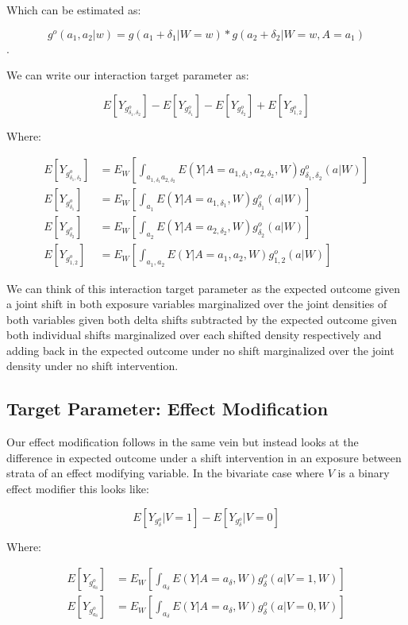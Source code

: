 \documentclass[
]{article}
\begin{document}
Which can be estimated as:

\[g^o(a_1, a_2|w) =  g(a_1 + \delta_1|W = w) * g(a_2 + \delta_2|W = w, A = a_1)\].

We can write our interaction target parameter as:

\[E[Y_{g^o_{\delta_1,\delta_2}}] - E[Y_{g^o_{\delta_1}}] - E[Y_{g^o_{\delta_2}}] + E[Y_{g^o_{1,2}}]\]

Where:

\begin{equation} \label{eq2}
\begin{split}
E[Y_{g^o_{\delta_1,\delta_2}}] &= E_W [\int_{a_{1,\delta_1} a_{2, \delta_2}} E(Y|A=a_{1,\delta_1},a_{2,\delta_2} , W)g^o_{\delta_1,\delta_2}(a|W)]\\
E[Y_{g^o_{\delta_1}}] &= E_W [\int_{a_1} E(Y|A=a_{1, \delta_1}, W)g^o_{\delta_1}(a|W)]\\
E[Y_{g^o_{\delta_2}}] &= E_W [\int_{a_2} E(Y|A=a_{2, \delta_2}, W)g^o_{\delta_2}(a|W)]\\
E[Y_{g^o_{1,2}}] &= E_W [\int_{a_1,a_2} E(Y|A=a_1,a_2, W)g^o_{1,2}(a|W)]
\end{split}
\end{equation}

We can think of this interaction target parameter as the expected
outcome given a joint shift in both exposure variables marginalized over
the joint densities of both variables given both delta shifts subtracted
by the expected outcome given both individual shifts marginalized over
each shifted density respectively and adding back in the expected
outcome under no shift marginalized over the joint density under no
shift intervention.

\hypertarget{target-parameter-effect-modification}{%
\subsection{Target Parameter: Effect
Modification}\label{target-parameter-effect-modification}}

Our effect modification follows in the same vein but instead looks at
the difference in expected outcome under a shift intervention in an
exposure between strata of an effect modifying variable. In the
bivariate case where \(V\) is a binary effect modifier this looks like:

\[E[Y_{g^o_{\delta}} | V = 1] - E[Y_{g^o_{\delta}} | V = 0]\]

Where:

\begin{equation} \label{eq3}
\begin{split}
E[Y_{g^o_{a_\delta}}] &= E_W [\int_{a_{\delta}} E(Y|A=a_{\delta}, W)g^o_{\delta}(a | V = 1, W)]\\

E[Y_{g^o_{a_\delta}}] &= E_W [\int_{a_{\delta}} E(Y|A=a_{\delta}, W)g^o_{\delta}(a | V = 0, W)]
\end{split}
\end{equation}
\end{document}
